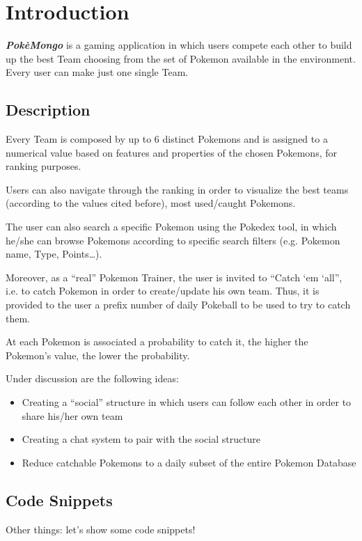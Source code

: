 \section{Introduction}
\textbf{\textit{PokèMongo}} is a gaming application in which users compete each other to build up the best Team choosing from the set of Pokemon available in the environment. Every user can make just one single Team. 

\subsection{Description}
Every Team is composed by up to 6 distinct Pokemons and is assigned to a numerical value based on features and properties of the chosen Pokemons, for ranking purposes.

Users can also navigate through the ranking in order to visualize the best teams (according to the values cited before), most used/caught Pokemons.

The user can also search a specific Pokemon using the Pokedex tool, in which he/she can browse Pokemons according to specific search filters (e.g. Pokemon name, Type, Points…).

Moreover, as a “real” Pokemon Trainer, the user is invited to “Catch ‘em ‘all”, i.e. to catch Pokemon in order to create/update his own team. Thus, it is provided to the user a prefix number of daily Pokeball to be used to try to catch them. 

At each Pokemon is associated a probability to catch it, the higher the Pokemon’s value, the lower the probability.

Under discussion are the following ideas:
\begin{itemize}
    \item Creating a “social” structure in which users can follow each other in order to share his/her own team
    \item Creating a chat system to pair with the social structure 
    \item Reduce catchable Pokemons to a daily subset of the entire Pokemon Database
\end{itemize} 

\subsection{Code Snippets}
Other things: let's show some code snippets!

